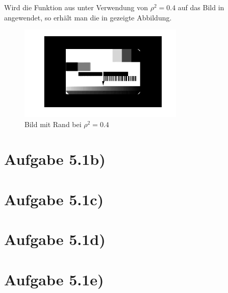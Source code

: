 Wird die Funktion aus  unter Verwendung von $ρ^2 = 0.4$ auf das
Bild in  angewendet, so erhält man die in  gezeigte Abbildung.

\begin{figure}[htb]
\centering
  \includegraphics[width=0.7\textwidth,keepaspectratio]{../tmp/eins_a}
  \caption{Bild mit Rand bei $ρ^2 = 0.4$}
  \label{fig:1a}
\end{figure}

\section*{Aufgabe 5.1b)}
\section*{Aufgabe 5.1c)}
\section*{Aufgabe 5.1d)}
\section*{Aufgabe 5.1e)}